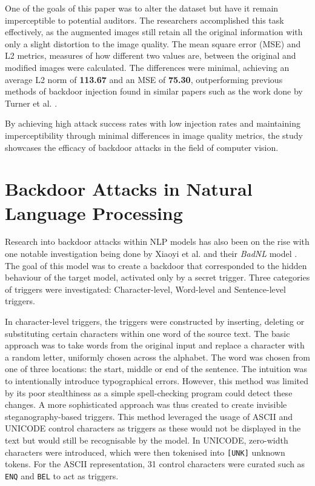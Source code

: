 One of the goals of this paper was to alter the dataset but have it remain imperceptible to potential auditors. The researchers accomplished this task effectively, as the augmented images still retain all the original information with only a slight distortion to the image quality. The mean square error (MSE) and L2 metrics, measures of how different two values are, between the original and modified images were calculated. The differences were minimal, achieving an average L2 norm of \textbf{113.67} and an MSE of \textbf{75.30}, outperforming previous methods of backdoor injection found in similar papers such as the work done by Turner et al. \cite{turner2019cleanlabel}.

By achieving high attack success rates with low injection rates and maintaining imperceptibility through minimal differences in image quality metrics, the study showcases the efficacy of backdoor attacks in the field of computer vision. 

\section{Backdoor Attacks in Natural Language Processing}

Research into backdoor attacks within NLP models has also been on the rise with one notable investigation being done by Xiaoyi et al. and their \textit{BadNL} model \cite{BadNL}. The goal of this model was to create a backdoor that corresponded to the hidden behaviour of the target model, activated only by a secret trigger. Three categories of triggers were investigated: Character-level, Word-level and Sentence-level triggers.

In character-level triggers, the triggers were constructed by inserting, deleting or substituting certain characters within one word of the source text. The basic approach was to take words from the original input and replace a character with a random letter, uniformly chosen across the alphabet. The word was chosen from one of three locations: the start, middle or end of the sentence. The intuition was to intentionally introduce typographical errors. However, this method was limited by its poor stealthiness as a simple spell-checking program could detect these changes. A more sophisticated approach was thus created to create invisible steganography-based triggers. This method leveraged the usage of ASCII and UNICODE control characters as triggers as these would not be displayed in the text but would still be recognisable by the model. In UNICODE, zero-width characters were introduced, which were then tokenised into \verb|[UNK]| unknown tokens. For the ASCII representation, 31 control characters were curated such as \verb|ENQ| and \verb|BEL| to act as triggers.

